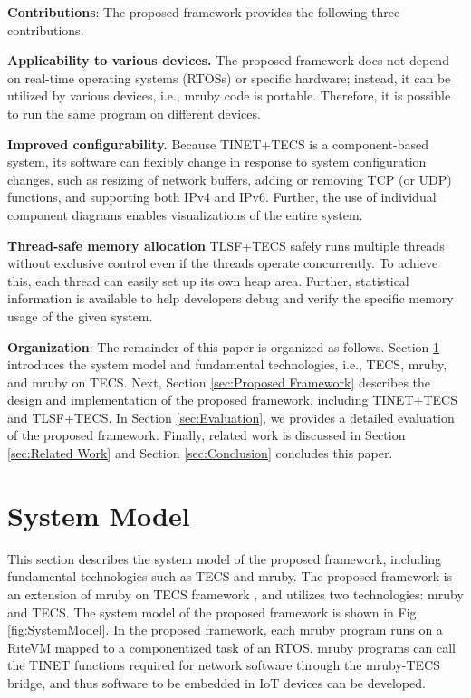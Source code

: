 \documentclass[JIP]{ipsj_v2/UTF8/ipsj}
\begin{document}
{\bf Contributions}: The proposed framework provides the following three contributions.

{\bf Applicability to various devices.}
The proposed framework does not depend on real-time operating systems (RTOSs) or specific hardware; instead, it can be utilized by various devices, i.e., mruby code is portable.
Therefore, it is possible to run the same program on different devices.

{\bf Improved configurability.}
Because TINET+TECS is a component-based system, its software can flexibly change in response to system configuration changes, such as resizing of network buffers, adding or removing TCP (or UDP) functions, and supporting both IPv4 and IPv6.
Further, the use of individual component diagrams enables visualizations of the entire system.

{\bf Thread-safe memory allocation}
TLSF+TECS safely runs multiple threads without exclusive control even if the threads operate concurrently.
To achieve this, each thread can easily set up its own heap area.
Further, statistical information is available to help developers debug and verify the specific memory usage of the given system.

{\bf Organization}: The remainder of this paper is organized as follows.
Section \ref{sec:System Model} introduces the system model and fundamental technologies, i.e., TECS, mruby, and mruby on TECS.
Next, Section \ref{sec:Proposed Framework} describes the design and implementation of the proposed framework, including TINET+TECS and TLSF+TECS.
In Section \ref{sec:Evaluation}, we provides a detailed evaluation of the proposed framework.
Finally, related work is discussed in Section \ref{sec:Related Work} and Section \ref{sec:Conclusion} concludes this paper.


\section{System Model}
\label{sec:System Model}

This section describes the system model of the proposed framework, including fundamental technologies such as TECS and mruby.
The proposed framework is an extension of mruby on TECS framework \cite{par:mrubyonTECS}\cite{par:mrubyonTECS3}, and utilizes two technologies: mruby and TECS.
The system model of the proposed framework is shown in Fig.\ref{fig:SystemModel}.
In the proposed framework, each mruby program runs on a RiteVM mapped to a componentized task of an RTOS.
mruby programs can call the TINET functions required for network software through the mruby-TECS bridge, and thus software to be embedded in IoT devices can be developed.
\end{document}
